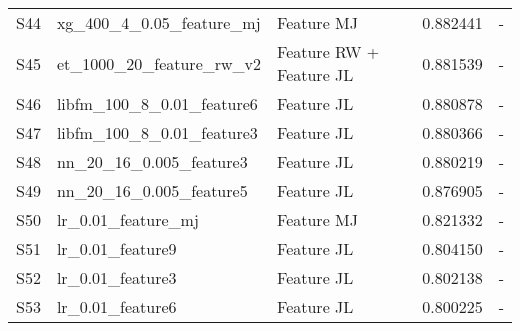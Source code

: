 \begin{table*}[t]
\begin{center}
\begin{tabular}{lllll}
S44 	& xg\_400\_4\_0.05\_feature\_mj	& Feature MJ							& 0.882441	& - \\
S45	& et\_1000\_20\_feature\_rw\_v2	& Feature RW + Feature JL				& 0.881539	& - \\
S46	& libfm\_100\_8\_0.01\_feature6	& Feature JL							& 0.880878	& - \\
S47	& libfm\_100\_8\_0.01\_feature3	& Feature JL							& 0.880366	& - \\
S48	& nn\_20\_16\_0.005\_feature3	& Feature JL								& 0.880219	& - \\
S49	& nn\_20\_16\_0.005\_feature5	& Feature JL								& 0.876905	& - \\
S50	& lr\_0.01\_feature\_mj		& Feature MJ								& 0.821332	& - \\
S51	& lr\_0.01\_feature9		& Feature JL									& 0.804150	& - \\
S52	& lr\_0.01\_feature3		& Feature JL									& 0.802138	& - \\
S53	& lr\_0.01\_feature6		& Feature JL									& 0.800225	& - \\
\end{tabular}
\end{center}
\end{table*}